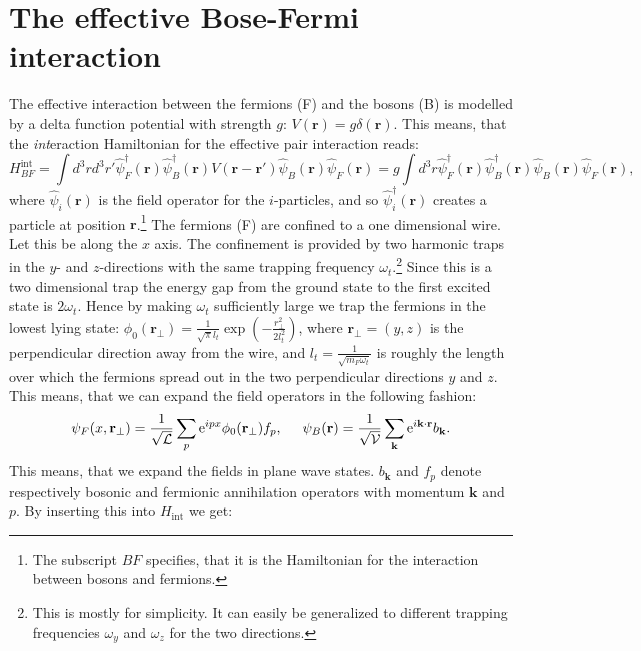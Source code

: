 \section{The effective Bose-Fermi interaction}
The effective interaction between the fermions (F) and the bosons (B) is modelled by a delta function potential with strength $g$: $V(\mathbf{r})=g\delta(\mathbf{r})$. This means, that the \textit{int}eraction Hamiltonian for the effective pair interaction reads:
\begin{equation}
H_{BF}^\text{int}  = \int d^3 r d^3 r' \hat{\psi}_F^\dagger(\mathbf{r}) \hat{\psi}_B^\dagger(\mathbf{r})V(\mathbf{r}-\mathbf{r}')\hat{\psi}_B(\mathbf{r})\hat{\psi}_F(\mathbf{r}) = g\int d^3 r \hat{\psi}_F^\dagger(\mathbf{r}) \hat{\psi}_B^\dagger(\mathbf{r})\hat{\psi}_B(\mathbf{r})\hat{\psi}_F(\mathbf{r}),
\end{equation}
where $\hat{\psi}_i(\mathbf{r})$ is the field operator for the $i$-particles, and so $\hat{\psi}_i^\dagger(\mathbf{r})$ creates a particle at position $\mathbf{r}$.\footnote{The subscript $BF$ specifies, that it is the Hamiltonian for the interaction between bosons and fermions.} The fermions (F) are confined to a one dimensional wire. Let this be along the $x$ axis. The confinement is provided by two harmonic traps in the $y$- and $z$-directions with the same trapping frequency $\omega_t$.\footnote{This is mostly for simplicity. It can easily be generalized to different trapping frequencies $\omega_y$ and $\omega_z$ for the two directions.} Since this is a two dimensional trap the energy gap from the ground state to the first excited state is $2\omega_t$. Hence by making $\omega_t$ sufficiently large we trap the fermions in the lowest lying state: $\phi_0(\mathbf{r}_\perp) = \frac{1}{\sqrt{\pi}l_t}\exp\left(-\frac{r_\perp^2}{2l_t^2}\right)$, where $\mathbf{r}_\perp = (y,z)$ is the perpendicular direction away from the wire, and $l_t = \frac{1}{\sqrt{m_F \omega_t}}$ is roughly the length over which the fermions spread out in the two perpendicular directions $y$ and $z$. This means, that we can expand the field operators in the following fashion:
\begin{equation}
\psi_F(x,\mathbf{r}_\perp) = \frac{1}{\sqrt{\mathcal{L}}}\sum_p \text{e}^{ipx} \phi_0(\mathbf{r}_\perp) f_p, \hspace{0.5cm} \psi_B(\mathbf{r}) = \frac{1}{\sqrt{\mathcal{V}}}\sum_{\mathbf{k}} \text{e}^{i\mathbf{k}\cdot \mathbf{r}} b_\mathbf{k}. 
\end{equation}   
This means, that we expand the fields in plane wave states. $b_\mathbf{k}$ and $f_p$ denote respectively bosonic and fermionic annihilation operators with momentum $\mathbf{k}$ and $p$.  By inserting this into $H_\text{int}$ we get:
